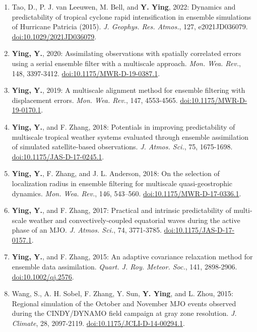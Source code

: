 \begin{enumerate}
\item Tao, D., P. J. van Leeuwen, M. Bell, and \textbf{Y. Ying}, 2022: Dynamics and predictability of tropical cyclone rapid intensification in ensemble simulations of Hurricane Patricia (2015). 
\textit{J. Geophys. Res. Atmos.}, 127, e2021JD036079. 
\href{https://doi.org/10.1029/2021JD036079}{doi:10.1029/2021JD036079}.

\item \textbf{Ying, Y.}, 2020: Assimilating observations with spatially correlated errors using a serial ensemble filter with a multiscale approach. 
\textit{Mon. Wea. Rev.}, 148, 3397-3412. 
\href{https://doi.org/10.1175/MWR-D-19-0387.1}{doi:10.1175/MWR-D-19-0387.1}.

\item \textbf{Ying, Y.}, 2019: A multiscale alignment method for ensemble filtering with displacement errors. 
\textit{Mon. Wea. Rev.}, 147, 4553-4565. 
\href{https://doi.org/10.1175/MWR-D-19-0170.1}{doi:10.1175/MWR-D-19-0170.1}.

\item \textbf{Ying, Y.}, and F. Zhang, 2018: Potentials in improving predictability of multiscale tropical weather systems evaluated through ensemble assimilation of simulated satellite-based observations. 
\textit{J. Atmos. Sci.}, 75, 1675-1698. 
\href{https://doi.org/10.1175/JAS-D-17-0245.1}{doi:10.1175/JAS-D-17-0245.1}.

\item \textbf{Ying, Y.}, F. Zhang, and J. L. Anderson, 2018: On the selection of localization radius in ensemble filtering for multiscale quasi-geostrophic dynamics. 
\textit{Mon. Wea. Rev.}, 146, 543–560. 
\href{https://doi.org/10.1175/MWR-D-17-0336.1}{doi:10.1175/MWR-D-17-0336.1}.

\item \textbf{Ying, Y.}, and F. Zhang, 2017: Practical and intrinsic predictability of multi-scale weather and convectively-coupled equatorial waves during the active phase of an MJO. 
\textit{J. Atmos. Sci.}, 74, 3771-3785. 
\href{https://doi.org/10.1175/JAS-D-17-0157.1}{doi:10.1175/JAS-D-17-0157.1}.

\item \textbf{Ying, Y.}, and F. Zhang, 2015: An adaptive covariance relaxation method for ensemble data assimilation. 
\textit{Quart. J. Roy. Meteor. Soc.}, 141, 2898-2906. 
\href{https://doi.org/10.1002/qj.2576}{doi:10.1002/qj.2576}.

\item Wang, S., A. H. Sobel, F. Zhang, Y. Sun, \textbf{Y. Ying}, and L. Zhou, 2015: Regional simulation of the October and November MJO events observed during the CINDY/DYNAMO field campaign at gray zone resolution. 
\textit{J. Climate}, 28, 2097-2119. 
\href{https://doi.org/10.1175/JCLI-D-14-00294.1}{doi:10.1175/JCLI-D-14-00294.1}.


\end{enumerate}

